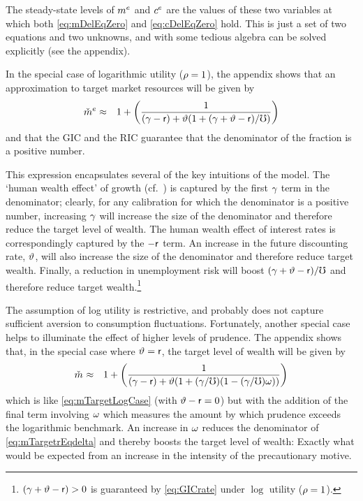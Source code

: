 \documentclass{handout}
\begin{document}
The steady-state levels of $m^{e}$ and $c^{e}$ are the values of these two variables at which both
\eqref{eq:mDelEqZero} and \eqref{eq:cDelEqZero} hold.  This is
just a set of two equations and two unknowns, and with some tedious
algebra can be solved explicitly (see the appendix).

In the special case of logarithmic utility ($\rho = 1$), the
appendix shows that an approximation to target market resources will be given by
\begin{eqnarray}
 \check{m}^{e} & \approx & 1 + \left(\frac{1}{(\gamma-\mathsf{r})+\vartheta(1+(\gamma+\vartheta-\mathsf{r})/\mho)}\right) \label{eq:mTargetLogCase}
\end{eqnarray}
and that the GIC and the RIC guarantee that the denominator of the fraction is a positive number.

This expression encapsulates several of the key intuitions of the model.  The
`human wealth effect' of growth (cf.\ \cite{summersCapTax}) is captured by the first $\gamma$ term in the denominator;
clearly, for any calibration for which the denominator is a positive number, increasing
$\gamma$ will increase the size of the denominator and therefore reduce the target
level of wealth.  The human wealth effect of interest rates is  correspondingly captured
by the $-\mathsf{r}$ term.  An increase in the future discounting rate, $\vartheta$, will also
increase the size of the denominator and therefore reduce target wealth.  Finally,
a reduction in unemployment risk will boost $(\gamma+\vartheta-\mathsf{r})/\mho$ and therefore reduce target
wealth.\footnote{$(\gamma+\vartheta-\mathsf{r}) > 0$ is guaranteed by \eqref{eq:GICrate} under $\log$ utility ($\rho=1$).}

The assumption of log utility is restrictive, and probably does not capture
sufficient aversion to consumption fluctuations.  Fortunately, another special
case helps to illuminate the effect of higher levels of prudence.  The appendix shows that, in the special case where $\vartheta=\mathsf{r}$, the
target level of wealth will be given by
\begin{eqnarray}
 \mTarg^{\null} & \approx & 1 + \left(\frac{1}{(\pGro-\rfree)+\timeRate(1+(\pGro/\urate)(1-(\pGro/\urate)\prudEx))}\right) \label{eq:mTargetrEqdelta}
\end{eqnarray}
which is like \eqref{eq:mTargetLogCase} (with $\vartheta-\mathsf{r}=0$) but with the addition of the final term involving $\omega$ which measures the amount by which prudence exceeds the logarithmic benchmark.
An increase in $\omega$ reduces the denominator of \eqref{eq:mTargetrEqdelta}
and thereby boosts the target level of wealth: Exactly what would be expected from
an increase in the intensity of the precautionary motive.
\end{document}
